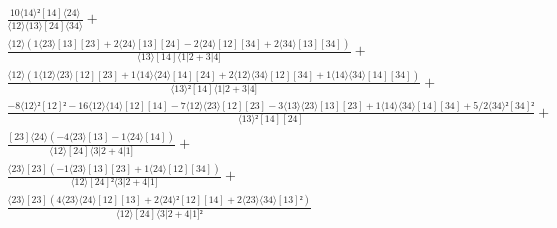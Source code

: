 \documentclass[varwidth, border=5pt]{standalone}
\begin{document}
\begin{my}
$\begin{gathered}
\scriptscriptstyle\frac{10⟨14⟩²[14]⟨24⟩}{⟨12⟩⟨13⟩[24]⟨34⟩} +\\
\scriptscriptstyle\frac{⟨12⟩(1⟨23⟩[13][23]+2⟨24⟩[13][24]-2⟨24⟩[12][34]+2⟨34⟩[13][34])}{⟨13⟩[14]⟨1|2+3|4]} +\\
\scriptscriptstyle\frac{⟨12⟩(1⟨12⟩⟨23⟩[12][23]+1⟨14⟩⟨24⟩[14][24]+2⟨12⟩⟨34⟩[12][34]+1⟨14⟩⟨34⟩[14][34])}{⟨13⟩²[14]⟨1|2+3|4]} +\\
\scriptscriptstyle\frac{-8⟨12⟩²[12]²-16⟨12⟩⟨14⟩[12][14]-7⟨12⟩⟨23⟩[12][23]-3⟨13⟩⟨23⟩[13][23]+1⟨14⟩⟨34⟩[14][34]+5/2⟨34⟩²[34]²}{⟨13⟩²[14][24]} +\\
\scriptscriptstyle\frac{[23]⟨24⟩(-4⟨23⟩[13]-1⟨24⟩[14])}{⟨12⟩[24]⟨3|2+4|1]} +\\
\scriptscriptstyle\frac{⟨23⟩[23](-1⟨23⟩[13][23]+1⟨24⟩[12][34])}{⟨12⟩[24]²⟨3|2+4|1]} +\\
\scriptscriptstyle\frac{⟨23⟩[23](4⟨23⟩⟨24⟩[12][13]+2⟨24⟩²[12][14]+2⟨23⟩⟨34⟩[13]²)}{⟨12⟩[24]⟨3|2+4|1]²} \phantom{+}
\end{gathered}$
\end{my}
\end{document}
